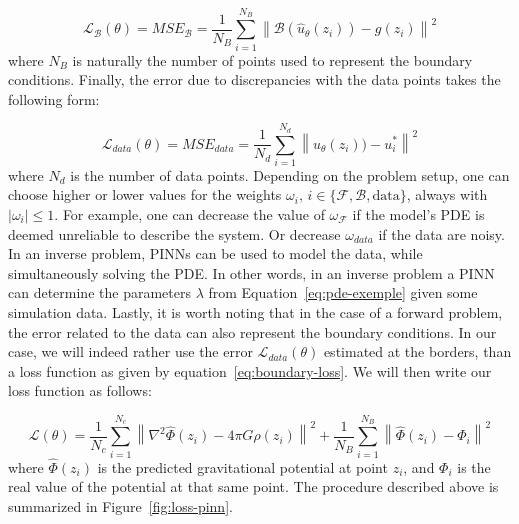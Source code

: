 \begin{equation}
    \label{eq:boundary-loss}
    \mathcal{L}_{\mathcal{B}}(\theta) = MSE_{\mathcal{B}} = \dfrac{1}{N_B}\sum^{N_B}_{i=1} \left\|\mathcal{B}(\hat{u}_{\theta}(z_i)) - g(z_i)\right\|^2
\end{equation} where $N_B$ is naturally the number of points used to represent the boundary conditions. Finally, the error due to discrepancies with the data points takes the following form:

\begin{equation}
    \label{eq:data-loss}
    \mathcal{L}_{data}(\theta) = MSE_{data} = \dfrac{1}{N_d}\sum^{N_d}_{i=1} \left\|\hat{u}_{\theta}(z_i)) - u^{*}_i\right\|^2
\end{equation} where $N_d$ is the number of data points. Depending on the problem setup, one can choose higher or lower values for the weights $\omega_i \text{, } i \in \{\mathcal{F}, \mathcal{B}, \mathrm{data}\}$, always with $|\omega_i| \leq 1$. For example, one can decrease the value of $\omega_{\mathcal{F}}$ if the model's PDE is deemed unreliable to describe the system. Or decrease $\omega_{data}$ if the data are noisy. In an inverse problem, PINNs can be used to model the data, while simultaneously solving the PDE. In other words, in an inverse problem a PINN can determine the parameters $\lambda$ from Equation~\eqref{eq:pde-exemple} given some simulation data. Lastly, it is worth noting that in the case of a forward problem, the error related to the data can also represent the boundary conditions. In our case, we will indeed rather use the error $\mathcal{L}_{data}(\theta)$ estimated at the borders, than a loss function as given by equation~\eqref{eq:boundary-loss}. We will then write our loss function as follows:

\begin{equation}
    \label{eq:loss-galaxy}
    \mathcal{L}(\theta) = \dfrac{1}{N_c}\sum^{N_c}_{i=1} \left\|\nabla^2 \hat{\Phi}(z_i) - 4 \pi G \rho(z_i) \right\|^2 + \dfrac{1}{N_B}\sum^{N_B}_{i=1} \left\|\hat{\Phi}(z_i) - \Phi_i \right\|^2
\end{equation}
where $\hat{\Phi}(z_i)$ is the predicted gravitational potential at point $z_i$, and $\Phi_i$ is the real value of the potential at that same point. The procedure described above is summarized in Figure~\ref{fig:loss-pinn}.

